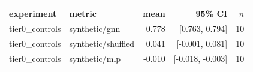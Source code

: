\begin{tabular}{llrrr}
\toprule
experiment & metric & mean & 95\% CI & $n$ \\
\midrule
tier0\_controls & synthetic/gnn & 0.778 & [0.763, 0.794] & 10 \\
tier0\_controls & synthetic/shuffled & 0.041 & [-0.001, 0.081] & 10 \\
tier0\_controls & synthetic/mlp & -0.010 & [-0.018, -0.003] & 10 \\
\bottomrule
\end{tabular}
